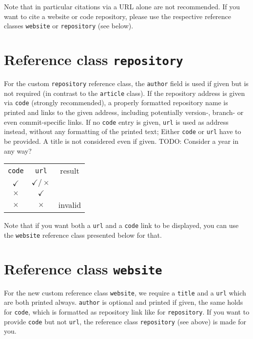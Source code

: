 \documentclass[a4paper,twocolumn,11pt]{quantumarticle}
\begin{document}
	Note that in particular citations via a URL alone are not recommended. If you want to cite a website or code repository, please use the respective reference classes \texttt{website} or \texttt{repository} (see below).
	
	
	\pagebreak
	\section{Reference class \texttt{repository}}
	For the custom \texttt{repository} reference class, the \texttt{author} field is used if given but is not required (in contrast to the \texttt{article} class).
	If the repository address is given via \texttt{code} (strongly recommended), a properly formatted repository name is printed and links to the given address, including potentially version-, branch- or even commit-specific links.
	If no \texttt{code} entry is given, \texttt{url} is used as address instead, without any formatting of the printed text; Either \texttt{code} or \texttt{url} have to be provided.
	A title is not considered even if given.
	TODO: Consider a year in any way?
	
	\begin{tabular}{ccc}
		\texttt{code}& \texttt{url} & result \\
		$\checkmark$ & $\checkmark\big / \times$ &\citerepo{repo_code_url} \\
		$\times$ & $\checkmark$ &\citerepo{repo_url} \\
		$\times$ & $\times$ & invalid \\
	\end{tabular}
	
	Note that if you want both a \texttt{url} and a \texttt{code} link to be displayed, you can use the \texttt{website} reference class presented below for that.
	
	
	\section{Reference class \texttt{website}}
	For the new custom reference class \texttt{website}, we require a \texttt{title} and a \texttt{url} which are both printed always.
	\texttt{author} is optional and printed if given, the same holds for \texttt{code}, which is formatted as repository link like for \texttt{repository}. If you want to provide \texttt{code} but not \texttt{url}, the reference class \texttt{repository} (see above) is made for you.
	
\end{document}
